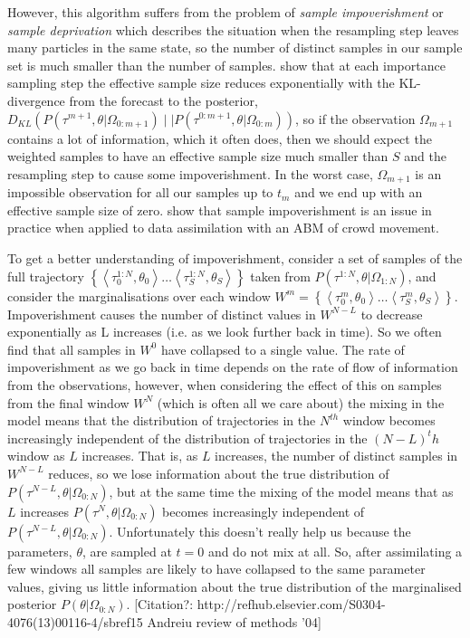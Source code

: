 \documentclass{article}
\begin{document}
However, this algorithm suffers from the problem of \textit{sample impoverishment} \citep{li2014fight} or \textit{sample deprivation} which describes the situation when the resampling step leaves many particles in the same state, so the number of distinct samples in our sample set is much smaller than the number of samples. \citet{chatterjee2018sample} show that at each importance sampling step the effective sample size reduces exponentially with the KL-divergence from the forecast to the posterior, $D_{KL}\left(P(\tau^{m+1},\theta|\Omega_{0:m+1}) \mid\mid P(\tau^{0:m+1},\theta|\Omega_{0:m})\right)$, so if the observation $\Omega_{m+1}$ contains a lot of information, which it often does, then we should expect the weighted samples to have an effective sample size much smaller than $S$ and the resampling step to cause some impoverishment. In the worst case, $\Omega_{m+1}$ is an impossible observation for all our samples up to $t_m$ and we end up with an effective sample size of zero. \citet{malleson_simulating_2020} show that sample impoverishment is an issue in practice when applied to data assimilation with an ABM of crowd movement.

To get a better understanding of impoverishment, consider a set of samples of the full trajectory $\left\{\left<\tau^{1:N}_0,\theta_0\right> \dots \left<\tau^{1:N}_S,\theta_S\right>\right\}$ taken from $P(\tau^{1:N},\theta|\Omega_{1:N})$, and consider the marginalisations over each window $W^m = \left\{\left<\tau^m_0,\theta_0\right> \dots \left<\tau^m_S,\theta_S\right>\right\}$. Impoverishment causes the number of distinct values in $W^{N-L}$ to decrease exponentially as L increases (i.e. as we look further back in time). So we often find that all samples in $W^0$ have collapsed to a single value. The rate of impoverishment as we go back in time depends on the rate of flow of information from the observations, however, when considering the effect of this on samples from the final window $W^N$ (which is often all we care about) the mixing in the model means that the distribution of trajectories in the $N^{th}$ window becomes increasingly independent of the distribution of trajectories in the $(N-L)^th$ window as $L$ increases. That is, as $L$ increases, the number of distinct samples in $W^{N-L}$ reduces, so we lose information about the true distribution of $P(\tau^{N-L},\theta|\Omega_{0:N})$, but at the same time the mixing of the model means that as $L$ increases $P(\tau^{N},\theta|\Omega_{0:N})$ becomes increasingly independent of $P(\tau^{N-L},\theta|\Omega_{0:N})$. Unfortunately this doesn't really help us because the parameters, $\theta$, are sampled at $t=0$ and do not mix at all. So, after assimilating a few windows all samples are likely to have collapsed to the same parameter values, giving us little information about the true distribution of the marginalised posterior $P(\theta|\Omega_{0:N})$.  [Citation?: http://refhub.elsevier.com/S0304-4076(13)00116-4/sbref15 Andreiu review of methods '04]
\end{document}
